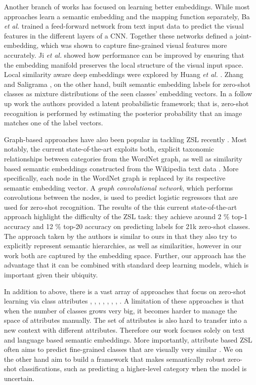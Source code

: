 \documentclass[12pt]{report}
\begin{document}
Another branch of works has focused on learning better embeddings. While most approaches learn a semantic embedding and the mapping function separately, Ba \textit{et al.} \cite{Ba2015} trained a feed-forward network from text input data to predict the visual features in the different layers of a CNN. Together these networks defined a joint-embedding, which was shown to capture fine-grained visual features more accurately. Ji \textit{et al.} \cite{Ji2017} showed how performance can be improved by ensuring that the embedding manifold preserves the local structure of the visual input space. Local similarity aware deep embeddings were explored by Huang \textit{et al.} \cite{Huang2016}. Zhang and Saligrama \cite{Zhang2015}, on the other hand, built semantic embedding labels for zero-shot classes as mixture distributions of the seen classes' embedding vectors. In a follow up work the authors \cite{Zhang2015a} provided a latent probabilistic framework; that is, zero-shot recognition is performed by estimating the posterior probability that an image matches one of the label vectors. 

Graph-based approaches have also been popular in tackling ZSL recently \cite{Fu2015a, Changpinyo2016, Wang2018a}. Most notably, the current state-of-the-art \cite{Wang2018a} exploits both, explicit taxonomic relationships between categories from the WordNet graph, as well as similarity based semantic embeddings constructed from the Wikipedia text data \cite{Pennington2014}. More specifically, each node in the WordNet graph is replaced by its respective semantic embedding vector. A \textit{graph convolutional network}, which performs convolutions between the nodes, is used to predict logistic regressors that are used for zero-shot recognition. The results of the this current state-of-the-art approach highlight the difficulty of the ZSL task: they achieve around 2 \% top-1 accuracy and 12 \% top-20 accuracy on predicting labels for 21k zero-shot classes. The approach taken by the authors is similar to ours in that they also try to explicitly represent semantic hierarchies, as well as similarities, however in our work both are captured by the embedding space. Further, our approach has the advantage that it can be combined with standard deep learning models, which is important given their ubiquity.

In addition to above, there is a vast array of approaches that focus on zero-shot learning via class attributes \cite{Farhadi2010}, \cite{Rohrbach2010}, \cite{Rohrbach2011}, \cite{Hwang2014}, \cite{Akata2016}, \cite{Xian2016}, \cite{Romera-Paredes2017}, \cite{Bucher2016}. A limitation of these approaches is that when the number of classes grows very big, it becomes harder to manage the space of attributes manually. The set of attributes is also hard to transfer into a new context \cite{Ba2014} with different attributes. Therefore our work focuses solely on text and language based semantic embeddings. More importantly, attribute based ZSL often aims to predict fine-grained classes that are visually very similar \cite{Xian2016} \cite{Reed2016}. We on the other hand aim to build a framework that makes semantically robust zero-shot classifications, such as predicting a higher-level category when the model is uncertain.
\end{document}
